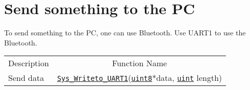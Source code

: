 \documentclass[a4paper,9pt]{extarticle}
\newcommand{\uintt}{\href{http://openswarm.org/os-doc/d6/dc2/definitions\_8h.html\#a1445ebbbf93d62972255ec5e89a5ab01}{\texttt{uint}}\xspace}
\newcommand{\uintE}{\href{http://openswarm.org/os-doc/d6/dc2/definitions\_8h.html\#adde6aaee8457bee49c2a92621fe22b79}{\texttt{uint8}}\xspace}
\begin{document}
\section{Send something to the PC}
To send something to the PC, one can use Bluetooth. Use UART1 to use the Bluetooth.


\begin{center}
\begin{tabular}{lc}
    \rowcolor{blue!50}
    Description				&	Function Name\\
    Send data  	& 	\href{http://openswarm.org/os-doc/d1/d87/uart_8c.html#a8528d7cc7f24e0051d8f7697605d9c8f}{\texttt{Sys\_Writeto\_UART1}}(\uintE *data,  \uintt length)
\end{tabular}\\
\end{center}


\end{document}
